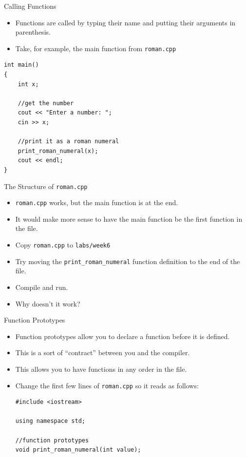 \documentclass[]{beamer}
\begin{document}
\begin{frame}[fragile]{Calling Functions}
    \begin{itemize}[<+->]
        \item Functions are called by typing their name and putting
            their arguments in parenthesis.
        \item Take, for example, the main function from
            \texttt{roman.cpp}
    \end{itemize}
    \pause
    \begin{BVerbatim}
int main()
{
    int x;

    //get the number
    cout << "Enter a number: ";
    cin >> x;

    //print it as a roman numeral
    print_roman_numeral(x);
    cout << endl;
}
    \end{BVerbatim}
\end{frame}

\begin{frame}{The Structure of \texttt{roman.cpp}}
    \begin{itemize}[<+->]
        \item \texttt{roman.cpp} works, but the main function is at
            the end.
        \item It would make more sense to have the main function be
            the first function in the file.
        \item Copy \texttt{roman.cpp} to \texttt{labs/week6}
        \item Try moving the \texttt{print\_roman\_numeral} function
            definition to the end of the file.
        \item Compile and run.  
        \item Why doesn't it work?
    \end{itemize}
\end{frame}

\begin{frame}[fragile]{Function Prototypes}
    \begin{itemize}[<+->]
        \item Function prototypes allow you to declare a function
            before it is defined.
        \item This is a sort of ``contract'' between you and the
            compiler.
        \item This allows you to have functions in any order in the
            file.  
        \item Change the first few lines of \texttt{roman.cpp} so it
            reads as follows:
            \newline
            \newline
            \begin{BVerbatim}
#include <iostream>

using namespace std;

//function prototypes
void print_roman_numeral(int value);
            \end{BVerbatim}
    \end{itemize}
\end{frame}
\end{document}

